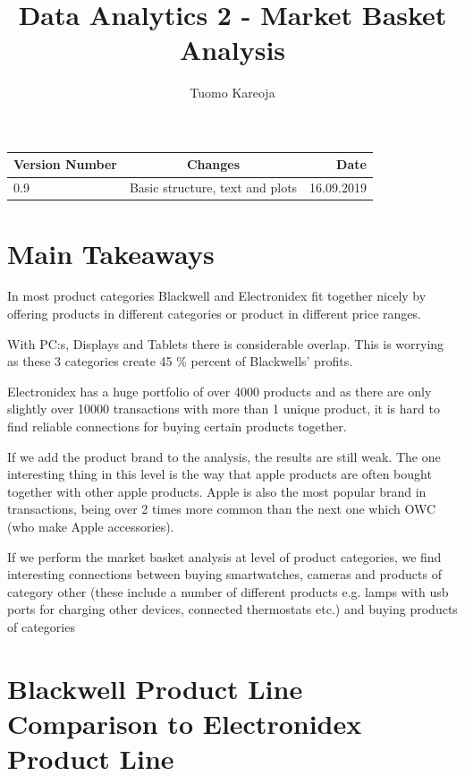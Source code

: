 \documentclass[12pt,a4paper,leqno]{report}
\title{Data Analytics 2 - Market Basket Analysis}
\author{Tuomo Kareoja}
\date{}
\theoremstyle{plain}
\theoremstyle{definition}
\theoremstyle{remark}
\begin{document}
\maketitle

\begin{table}[h!]
  \begin{center}
    \begin{tabular}{l|c|r}
      \textbf{Version Number} & \textbf{Changes} & \textbf{Date} \\
      \hline
      0.9 & Basic structure, text and plots & 16.09.2019\\
    \end{tabular}
  \end{center}
\end{table}

\newpage

\section{Main Takeaways}

In most product categories Blackwell and Electronidex fit together nicely by offering products in different categories or
product in different price ranges.

With PC:s, Displays and Tablets there is considerable overlap. This is worrying as these 3
categories create 45 \% percent of Blackwells' profits.

Electronidex has a huge portfolio of over 4000 products and as there are only slightly over 10000
transactions with more than 1 unique product, it is hard to find reliable connections for
buying certain products together.

If we add the product brand to the analysis, the results are still weak. The one interesting
thing in this level is the way that apple products are often bought together with other
apple products. Apple is also the most popular brand in transactions, being over 2 times
more common than the next one which OWC (who make Apple accessories).

If we perform the market basket analysis at level of product categories, we find interesting
connections between buying smartwatches, cameras and products of category other (these include
a number of different products e.g. lamps with usb ports for charging other devices, connected
thermostats etc.) and buying products of categories

\section{Blackwell Product Line Comparison to Electronidex Product Line}
\end{document}
